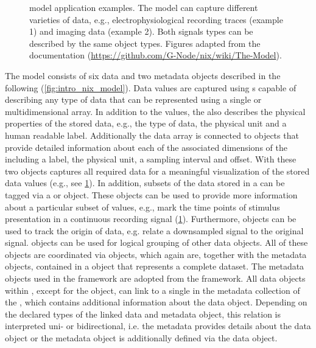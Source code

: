 \begin{figure}[hbt]
 \centering
 \scalebox{0.5}{
 }
 \caption[ model application examples]{ model application examples. The model can capture different varieties of data, e.g., electrophysiological recording traces (example 1) and imaging data (example 2). Both signals types can be described by the same  object types. Figures adapted from  the documentation (\url{https://github.com/G-Node/nix/wiki/The-Model}).}
 \label{fig:intro_nix_examples}
\end{figure}

The  model consists of six data and two metadata objects described in the following (\cref{fig:intro_nix_model}).
Data values are captured using s capable of describing any type of data that can be represented using a single or multidimensional array. In addition to the values, the  also describes the physical properties of the stored data, e.g., the type of data, the physical unit and a human readable label. Additionally the data array is connected to  objects that provide detailed information about each of the associated dimensions of the  including a label, the physical unit, a sampling interval and offset. With these two objects  captures all required data for a meaningful visualization of the stored data values (e.g., see \cref{fig:intro_nix_examples}). In addition, subsets of the data stored in a  can be tagged via a  or  object. These objects can be used to provide more information about a particular subset of values, e.g., mark the time points of stimulus presentation in a continuous recording signal (\ref{fig:intro_nix_examples}). Furthermore,  objects can be used to track the origin of data, e.g. relate a downsampled signal to the original signal.  objects can be used for logical grouping of other  data objects. All of these objects are coordinated via  objects, which again are, together with the metadata objects, contained in a   object that represents a complete dataset.
The metadata objects used in the  framework are adopted from the  framework. All data objects within , except for the  object, can link to a single  in the metadata collection of the  , which contains additional information about the data object. Depending on the declared types of the linked data and metadata object, this relation is interpreted uni- or bidirectional, i.e. the metadata  provides details about the data object or the metadata object is additionally defined via the data object.


